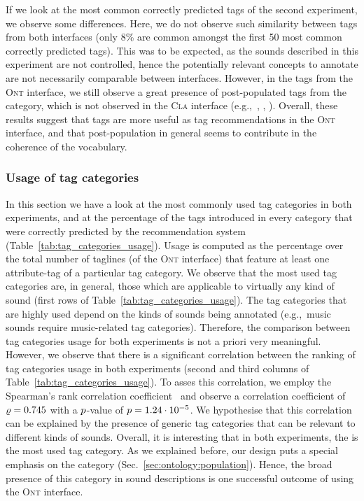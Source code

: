 If we look at the most common correctly predicted tags of the second experiment, we observe some differences.
Here, we do not observe such similarity between tags from both interfaces (only 8\% are common amongst the first 50 most common correctly predicted tags).
This was to be expected, as the sounds described in this experiment are not controlled, hence the potentially relevant concepts to annotate are not necessarily comparable between interfaces.
However, in the tags from the \textsc{Ont} interface, we still observe a great presence of post-populated tags from the  category, which is not observed in the \textsc{Cla} interface (e.g.,~, , ).
Overall, these results suggest that  tags are more useful as tag recommendations in the \textsc{Ont} interface, and that post-population in general seems to contribute in the coherence of the vocabulary.



\subsubsection{Usage of tag categories}

In this section we have a look at the most commonly used tag categories in both experiments, and at the percentage of the tags introduced in every category that were correctly predicted by the recommendation system (Table~\ref{tab:tag_categories_usage}).
Usage is computed as the percentage over the total number of taglines (of the \textsc{Ont} interface) that feature at least one attribute-tag of a particular tag category.
We observe that the most used tag categories are, in general, those which are applicable to virtually any kind of sound (first rows of Table~\ref{tab:tag_categories_usage}).
The tag categories that are highly used depend on the kinds of sounds being annotated (e.g.,~music sounds require music-related tag categories). Therefore, the comparison between tag categories usage for both experiments is not a priori very meaningful. However, we observe that there is a significant correlation between the ranking of tag categories usage in both experiments (second and third columns of Table~\ref{tab:tag_categories_usage}).
To asses this correlation, we employ the Spearman's rank correlation coefficient~\citep{Corder2009} and observe a correlation coefficient of $\varrho=0.745$ with a $p$-value of $p = 1.24\cdot 10^{-5}$. We hypothesise that this correlation can be explained by the presence of generic tag categories that can be relevant to different kinds of sounds.
Overall, it is interesting that in both experiments, the  is the most used tag category. As we explained before, our design puts a special emphasis on the  category (Sec.~\ref{sec:ontology:population}). 
Hence, the broad presence of this category in sound descriptions is one successful outcome of using the \textsc{Ont} interface.

